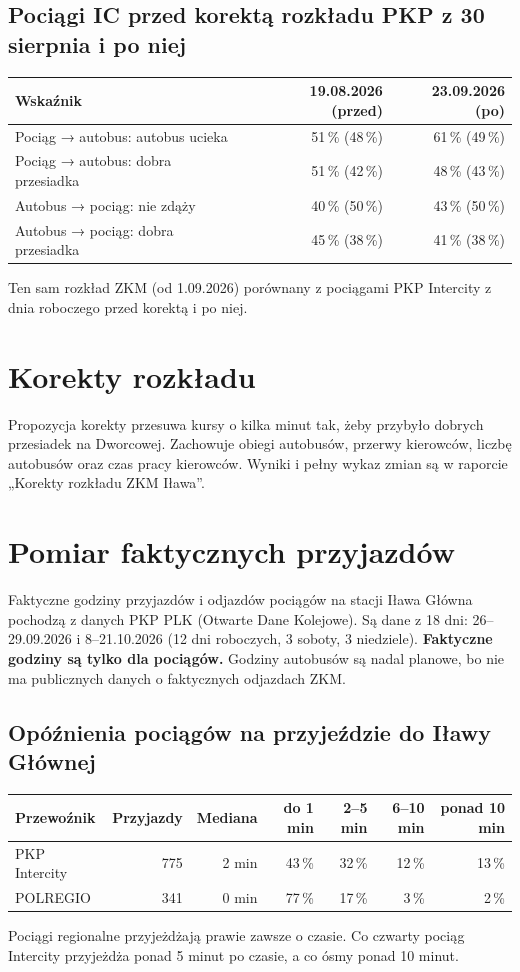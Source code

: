 \documentclass[10pt,a4paper]{article}
\newcommand{\mut}[1]{\textcolor{muted}{#1}}
\begin{document}
\subsection*{Pociągi IC przed korektą rozkładu PKP z 30 sierpnia i po niej}
{\small
\begin{center}\begin{tabular}{@{}l r r@{}}\toprule
Wskaźnik & 19.08.2026 (przed) & 23.09.2026 (po) \\ \midrule
Pociąg → autobus: autobus ucieka & 51\,\% \mut{(48\,\%)} & 61\,\% \mut{(49\,\%)} \\
Pociąg → autobus: dobra przesiadka & 51\,\% \mut{(42\,\%)} & 48\,\% \mut{(43\,\%)} \\
Autobus → pociąg: nie zdąży & 40\,\% \mut{(50\,\%)} & 43\,\% \mut{(50\,\%)} \\
Autobus → pociąg: dobra przesiadka & 45\,\% \mut{(38\,\%)} & 41\,\% \mut{(38\,\%)} \\
\bottomrule\end{tabular}\end{center}}
\mut{\footnotesize Ten sam rozkład ZKM (od 1.09.2026) porównany z pociągami PKP Intercity z dnia roboczego przed korektą i po niej.}
\section{Korekty rozkładu}
Propozycja korekty przesuwa kursy o kilka minut tak, żeby przybyło dobrych przesiadek na Dworcowej. Zachowuje obiegi autobusów, przerwy kierowców, liczbę autobusów oraz czas pracy kierowców. Wyniki i pełny wykaz zmian są w raporcie „Korekty rozkładu ZKM Iława”.
\section{Pomiar faktycznych przyjazdów}
Faktyczne godziny przyjazdów i odjazdów pociągów na stacji Iława Główna pochodzą z danych PKP PLK (Otwarte Dane Kolejowe). Są dane z 18 dni: 26--29.09.2026 i 8--21.10.2026 (12 dni roboczych, 3 soboty, 3 niedziele). \textbf{Faktyczne godziny są tylko dla pociągów.} Godziny autobusów są nadal planowe, bo nie ma publicznych danych o faktycznych odjazdach ZKM.

\subsection*{Opóźnienia pociągów na przyjeździe do Iławy Głównej}
{\small
\begin{center}\begin{tabular}{@{}l r r r r r r@{}}\toprule
Przewoźnik & Przyjazdy & Mediana & do 1 min & 2--5 min & 6--10 min & ponad 10 min \\ \midrule
PKP Intercity & 775 & 2 min & 43\,\% & 32\,\% & 12\,\% & 13\,\% \\
POLREGIO & 341 & 0 min & 77\,\% & 17\,\% & 3\,\% & 2\,\% \\
\bottomrule\end{tabular}\end{center}}
Pociągi regionalne przyjeżdżają prawie zawsze o czasie. Co czwarty pociąg Intercity przyjeżdża ponad 5 minut po czasie, a co ósmy ponad 10 minut.
\end{document}
